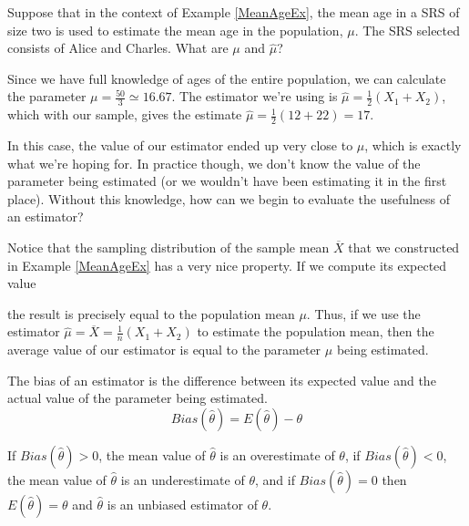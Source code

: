 \begin{examp}\label{MeanUnbiasedEx}Suppose that in the context of Example \ref{MeanAgeEx}, the mean age in a SRS of size two is used to estimate the mean age in the population, $\mu$. The SRS selected consists of Alice and Charles. What are $\mu$ and $\widehat{\mu}$?
\par
\noindent Since we have full knowledge of ages of the entire population, we can calculate the parameter $\mu = \frac{50}{3} \simeq 16.67$. The estimator we're using is $\widehat{\mu} = \frac{1}{2}(X_1+X_2)$, which with our sample, gives the estimate $\widehat{\mu} = \frac{1}{2}(12+22) = 17$.
\end{examp}
\par
In this case, the value of our estimator ended up very close to $\mu$, which is exactly what we're hoping for. In practice though, we don't know the value of the parameter being estimated (or we wouldn't have been estimating it in the first place). Without this knowledge, how can we begin to evaluate the usefulness of an estimator?
\par
Notice that the sampling distribution of the sample mean $\overline{X}$ that we constructed in Example \ref{MeanAgeEx} has a very nice property. If we compute its expected value 
\par
\noindent the result is precisely equal to the population mean $\mu$. Thus, if we use the estimator $\widehat\mu = \overline{X} = \frac{1}{n}(X_1+X_2)$ to estimate the population mean, then the average value of our estimator is equal to the parameter $\mu$ being estimated.

\begin{defn}\label{Unbiased Estimator} The bias of an estimator is the difference between its expected value and the actual value of the parameter being estimated.
$$\boxed{Bias(\widehat{\theta}) = E(\widehat{\theta}) - \theta}$$ 
\end{defn}
\par
If $Bias(\widehat{\theta}) > 0$, the mean value of $\widehat{\theta}$ is an overestimate of $\theta$, if $Bias(\widehat{\theta}) < 0$, the mean value of $\widehat{\theta}$ is an underestimate of $\theta$, and if $Bias(\widehat{\theta}) = 0$ then $E(\widehat{\theta}) = \theta$ and $\widehat{\theta}$ is an unbiased estimator of $\theta$.
\par

